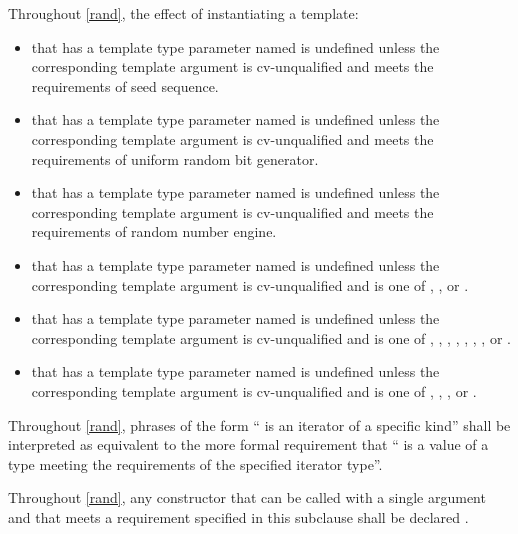 \pnum
Throughout \ref{rand},
the effect of instantiating a template:
\begin{itemize}
  \item
    that has a template type parameter
    named 
    is undefined unless the corresponding template argument
    is cv-unqualified and
    meets the requirements
    of seed sequence.
  \item
    that has a template type parameter
    named 
    is undefined unless the corresponding template argument
    is cv-unqualified and
    meets the requirements
    of uniform random bit generator.
  \item
    that has a template type parameter
    named 
    is undefined unless the corresponding template argument
    is cv-unqualified and
    meets the requirements
    of random number engine.
  \item
    that has a template type parameter
    named 
    is undefined unless the corresponding template argument
    is cv-unqualified and
    is one of
    , , or .
  \item
    that has a template type parameter
    named 
    is undefined unless the corresponding template argument
    is cv-unqualified and
    is one of
      ,
      ,
      ,
      ,
      ,
      ,
      ,
      or
      .
  \item
    that has a template type parameter
    named 
    is undefined unless the corresponding template argument
    is cv-unqualified and
    is one of
      ,
      ,
      ,
      or
      .
\end{itemize}

\pnum
Throughout \ref{rand},
phrases of the form `` is an iterator of a specific kind''
shall be interpreted as equivalent to the more formal requirement that
`` is a value
of a type meeting the requirements
of the specified iterator type''.

\pnum
Throughout \ref{rand},
any constructor that can be called with a single argument
and that meets a requirement specified in this subclause
shall be declared .

